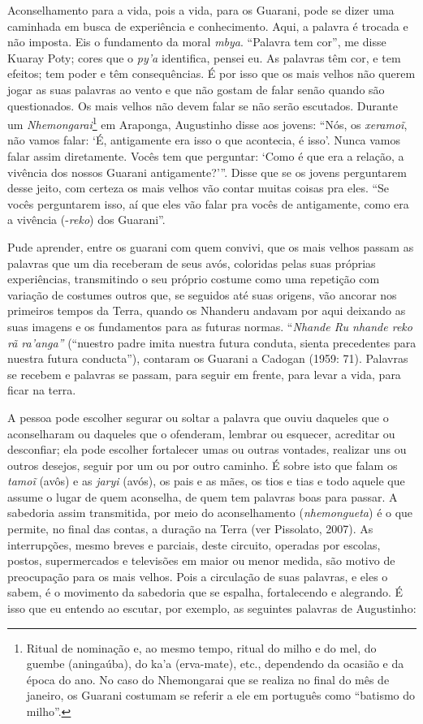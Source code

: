 Aconselhamento para a vida, pois a vida, para os Guarani, pode se dizer
uma caminhada em busca de experiência e conhecimento. Aqui, a palavra é
trocada e não imposta. Eis o fundamento da moral \emph{mbya}. ``Palavra
tem cor'', me disse Kuaray Poty; cores que o \emph{py'a} identifica,
pensei eu. As palavras têm cor, e tem efeitos; tem poder e têm
consequências. É por isso que os mais velhos não querem jogar as suas
palavras ao vento e que não gostam de falar senão quando são
questionados. Os mais velhos não devem falar se não serão escutados.
Durante um \emph{Nhemongarai}\footnote{Ritual de nominação e, ao mesmo
  tempo, ritual do milho e do mel, do guembe (aningaúba), do ka'a
  (erva-mate), etc., dependendo da ocasião e da época do ano. No caso do
  Nhemongarai que se realiza no final do mês de janeiro, os Guarani
  costumam se referir a ele em português como ``batismo do milho''.} em
Araponga, Augustinho disse aos jovens: ``Nós, os \emph{xeramoĩ}, não
vamos falar: `É, antigamente era isso o que acontecia, é isso'. Nunca
vamos falar assim diretamente. Vocês tem que perguntar: `Como é que era
a relação, a vivência dos nossos Guarani antigamente?'''. Disse que se
os jovens perguntarem desse jeito, com certeza os mais velhos vão contar
muitas coisas pra eles. ``Se vocês perguntarem isso, aí que eles vão
falar pra vocês de antigamente, como era a vivência (-\emph{reko}) dos
Guarani''.

Pude aprender, entre os guarani com quem convivi, que os mais velhos
passam as palavras que um dia receberam de seus avós, coloridas pelas
suas próprias experiências, transmitindo o seu próprio costume como uma
repetição com variação de costumes outros que, se seguidos até suas
origens, vão ancorar nos primeiros tempos da Terra, quando os Nhanderu
andavam por aqui deixando as suas imagens e os fundamentos para as
futuras normas. ``\emph{Nhande Ru nhande reko rã ra'anga''} (``nuestro
padre imita nuestra futura conduta, sienta precedentes para nuestra
futura conducta''), contaram os Guarani a Cadogan (1959: 71). Palavras
se recebem e palavras se passam, para seguir em frente, para levar a
vida, para ficar na terra.

A pessoa pode escolher segurar ou soltar a palavra que ouviu daqueles
que o aconselharam ou daqueles que o ofenderam, lembrar ou esquecer,
acreditar ou desconfiar; ela pode escolher fortalecer umas ou outras
vontades, realizar uns ou outros desejos, seguir por um ou por outro
caminho. É sobre isto que falam os \emph{tamoĩ} (avôs) e as \emph{jaryi}
(avós), os pais e as mães, os tios e tias e todo aquele que assume o
lugar de quem aconselha, de quem tem palavras boas para passar. A
sabedoria assim transmitida, por meio do aconselhamento
(\emph{nhemongueta}) é o que permite, no final das contas, a duração na
Terra (ver Pissolato, 2007). As interrupções, mesmo breves e parciais,
deste circuito, operadas por escolas, postos, supermercados e televisões
em maior ou menor medida, são motivo de preocupação para os mais velhos.
Pois a circulação de suas palavras, e eles o sabem, é o movimento da
sabedoria que se espalha, fortalecendo e alegrando. É isso que eu
entendo ao escutar, por exemplo, as seguintes palavras de Augustinho:

